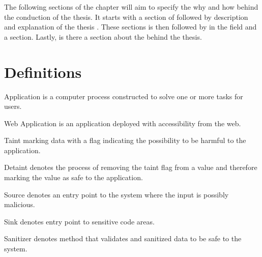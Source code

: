 The following sections of the chapter will aim to specify the why and how behind the conduction of the thesis. It starts with a section of \textit{} followed by \textit{} description and explanation of the thesis \textit{}. These sections is then followed by \textit{} in the field and a \textit{} section. Lastly, is there a section about the \textit{} behind the thesis.


\section{Definitions}
\label{Definitions}
\begin{definition}{Application}
    is a computer process constructed to solve one or more tasks for users.
    \\
\end{definition}

\begin{definition}{Web Application}
    is an application deployed with accessibility from the web.
    \\
\end{definition}

\begin{definition}{Taint}
    marking data with a flag indicating the possibility to be harmful to the application.
    \\
\end{definition}

\begin{definition}{Detaint}
    denotes the process of removing the taint flag from a value and therefore marking the value as safe to the application.
    \\
\end{definition}

\begin{definition}{Source}
    denotes an entry point to the system where the input is possibly malicious.
    \\
\end{definition}

\begin{definition}{Sink}
    denotes entry point to sensitive code areas.
    \\
\end{definition}

\begin{definition}{Sanitizer}
    denotes method that validates and sanitized data to be safe to the system.
    \\
\end{definition}

